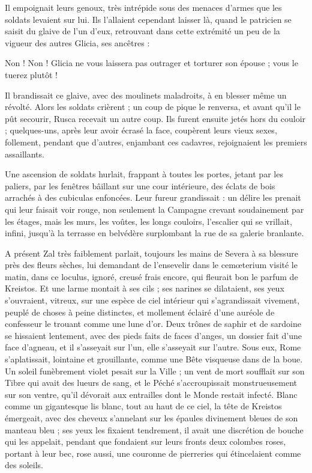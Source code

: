 \documentclass[a4paper, 11pt, oneside, polutonikogreek, french]{article}
\begin{document}
Il empoignait leurs genoux, très intrépide sous des menaces d'armes que les soldats levaient sur lui. Ils l'allaient cependant laisser là, quand le patricien se saisit du glaive de l'un d'eux, retrouvant dans cette extrémité un peu de la vigueur des autres Glicia, ses ancêtres :

Non ! Non ! Glicia ne vous laissera pas outrager et torturer son épouse ; vous le tuerez plutôt !

Il brandissait ce glaive, avec des moulinets maladroits, à en blesser même un révolté. Alors les soldats crièrent ; un coup de pique le renversa, et avant qu'il le pût secourir, Rusca recevait un autre coup. Ils furent ensuite jetés hors du couloir ; quelques-uns, après leur avoir écrasé la face, coupèrent leurs vieux sexes, follement, pendant que d'autres, enjambant ces cadavres, rejoignaient les premiers assaillants.

Une ascension de soldats hurlait, frappant à toutes les portes, jetant par les paliers, par les fenêtres bâillant sur une cour intérieure, des éclats de bois arrachés à des cubiculas enfoncées. Leur fureur grandissait : un délire les prenait qui leur faisait voir rouge, non seulement la Campagne crevant soudainement par les étages, mais les murs, les voûtes, les longs couloirs, l'escalier qui se vrillait, infini, jusqu'à la terrasse en belvédère surplombant la rue de sa galerie branlante.

A présent Zal très faiblement parlait, toujours les mains de Severa à sa blessure près des fleurs sèches, lui demandant de l'ensevelir dans le cemœterium visité le matin, dans ce loculus, ignoré, creusé frais encore, qui fleurait bon le parfum de Kreistos. Et une larme montait à ses cils ; ses narines se dilataient, ses yeux s'ouvraient, vitreux, sur une espèce de ciel intérieur qui s'agrandissait vivement, peuplé de choses à peine distinctes, et mollement éclairé d'une auréole de confesseur le trouant comme une lune d'or. Deux trônes de saphir et de sardoine se hissaient lentement, avec des pieds faits de faces d'anges, un dossier fait d'une face d'agneau, et il s'asseyait sur l'un, elle s'asseyait sur l'autre. Sous eux, Rome s'aplatissait, lointaine et grouillante, comme une Bête visqueuse dans de la boue. Un soleil funèbrement violet pesait sur la Ville ; un vent de mort soufflait sur son Tibre qui avait des lueurs de sang, et le Péché s'accroupissait monstrueusement sur son ventre, qu'il dévorait aux entrailles dont le Monde restait infecté. Blanc comme un gigantesque lis blanc, tout au haut de ce ciel, la tête de Kreistos émergeait, avec des cheveux s'annelant sur les épaules divinement bleues de son manteau bleu ; ses yeux les fixaient tendrement, il avait une discrétion de bouche qui les appelait, pendant que fondaient sur leurs fronts deux colombes roses, portant à leur bec, rose aussi, une couronne de pierreries qui étincelaient comme des soleils.
\end{document}
